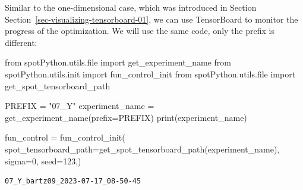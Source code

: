 \documentclass[
  letterpaper,
  DIV=11,
  numbers=noendperiod]{scrreprt}
\newenvironment{Shaded}{\begin{snugshade}}{\end{snugshade}}
\newcommand{\BuiltInTok}[1]{\textcolor[rgb]{0.00,0.23,0.31}{#1}}
\newcommand{\DecValTok}[1]{\textcolor[rgb]{0.68,0.00,0.00}{#1}}
\newcommand{\ImportTok}[1]{\textcolor[rgb]{0.00,0.46,0.62}{#1}}
\newcommand{\NormalTok}[1]{\textcolor[rgb]{0.00,0.23,0.31}{#1}}
\newcommand{\OperatorTok}[1]{\textcolor[rgb]{0.37,0.37,0.37}{#1}}
\newcommand{\StringTok}[1]{\textcolor[rgb]{0.13,0.47,0.30}{#1}}
\begin{document}
\begin{tcolorbox}[enhanced jigsaw, left=2mm, title=\textcolor{quarto-callout-note-color}{\faInfo}\hspace{0.5em}{TensorBoard}, bottomrule=.15mm, titlerule=0mm, breakable, rightrule=.15mm, toprule=.15mm, coltitle=black, colbacktitle=quarto-callout-note-color!10!white, leftrule=.75mm, arc=.35mm, colframe=quarto-callout-note-color-frame, bottomtitle=1mm, colback=white, opacitybacktitle=0.6, toptitle=1mm, opacityback=0]

Similar to the one-dimensional case, which was introduced in Section
Section~\ref{sec-visualizing-tensorboard-01}, we can use TensorBoard to
monitor the progress of the optimization. We will use the same code,
only the prefix is different:

\begin{Shaded}
\begin{Highlighting}[]
\ImportTok{from}\NormalTok{ spotPython.utils.}\BuiltInTok{file} \ImportTok{import}\NormalTok{ get\_experiment\_name}
\ImportTok{from}\NormalTok{ spotPython.utils.init }\ImportTok{import}\NormalTok{ fun\_control\_init}
\ImportTok{from}\NormalTok{ spotPython.utils.}\BuiltInTok{file} \ImportTok{import}\NormalTok{ get\_spot\_tensorboard\_path}

\NormalTok{PREFIX }\OperatorTok{=} \StringTok{"07\_Y"}
\NormalTok{experiment\_name }\OperatorTok{=}\NormalTok{ get\_experiment\_name(prefix}\OperatorTok{=}\NormalTok{PREFIX)}
\BuiltInTok{print}\NormalTok{(experiment\_name)}

\NormalTok{fun\_control }\OperatorTok{=}\NormalTok{ fun\_control\_init(}
\NormalTok{    spot\_tensorboard\_path}\OperatorTok{=}\NormalTok{get\_spot\_tensorboard\_path(experiment\_name),}
\NormalTok{    sigma}\OperatorTok{=}\DecValTok{0}\NormalTok{,}
\NormalTok{    seed}\OperatorTok{=}\DecValTok{123}\NormalTok{,)}
\end{Highlighting}
\end{Shaded}

\begin{verbatim}
07_Y_bartz09_2023-07-17_08-50-45
\end{verbatim}

\end{tcolorbox}
\end{document}
